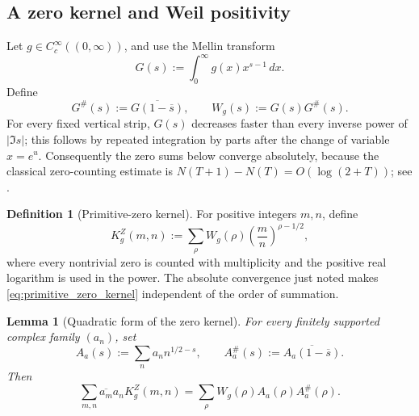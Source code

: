 \documentclass[11pt]{amsart}
\numberwithin{equation}{section}
\theoremstyle{plain}
\newtheorem{lemma}[theorem]{Lemma}
\theoremstyle{definition}
\newtheorem{definition}[theorem]{Definition}
\theoremstyle{remark}
\begin{document}
\subsection{A zero kernel and Weil positivity}
\label{subsec:zero_kernel_weil}

Let \(g\in C_c^\infty((0,\infty))\), and use the Mellin transform
\begin{equation}
G(s):=\int_0^\infty g(x)x^{s-1}\,dx.
\label{eq:Weil_Mellin_transform}
\end{equation}
Define
\begin{equation}
G^\#(s):=\overline{G(1-\overline{s})},
\qquad
W_g(s):=G(s)G^\#(s).
\label{eq:Weil_involution_weight}
\end{equation}
For every fixed vertical strip, \(G(s)\) decreases faster than every inverse
power of \(|\Im s|\); this follows by repeated integration by parts after the
change of variable \(x=e^u\).  Consequently the zero sums below converge
absolutely, because the classical zero-counting estimate is
\(N(T+1)-N(T)=O(\log(2+T))\); see \cite{Titchmarsh1986}.

\begin{definition}[Primitive-zero kernel]
\label{def:primitive_zero_kernel}
For positive integers \(m,n\), define
\begin{equation}
K_g^Z(m,n)
:=\sum_{\rho}W_g(\rho)
\left(\frac{m}{n}\right)^{\rho-1/2},
\label{eq:primitive_zero_kernel}
\end{equation}
where every nontrivial zero is counted with multiplicity and the positive real
logarithm is used in the power.  The absolute convergence just noted makes
\eqref{eq:primitive_zero_kernel} independent of the order of summation.
\end{definition}

\begin{lemma}[Quadratic form of the zero kernel]
\label{lem:zero_kernel_quadratic_form}
For every finitely supported complex family \((a_n)\), set
\begin{equation}
A_a(s):=\sum_n a_n n^{1/2-s},
\qquad
A_a^\#(s):=\overline{A_a(1-\overline{s})}.
\label{eq:Aa_and_involution}
\end{equation}
Then
\begin{equation}
\boxed{
\sum_{m,n}\overline{a_m}a_nK_g^Z(m,n)
=\sum_\rho W_g(\rho)A_a(\rho)A_a^\#(\rho).}
\label{eq:zero_kernel_quadratic_identity}
\end{equation}
\end{lemma}
\end{document}

